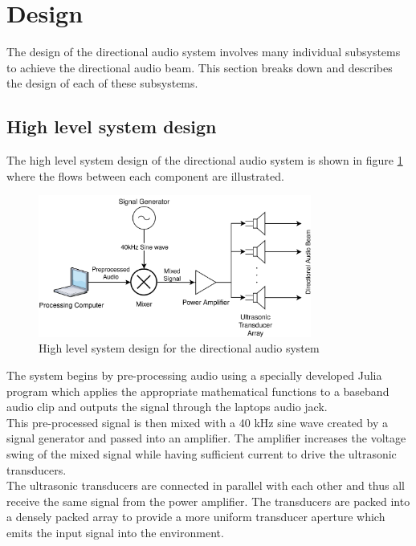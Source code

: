 \section{Design}
The design of the directional audio system involves many individual subsystems to achieve the directional audio beam. This section breaks down and describes the design of each of these subsystems.
\subsection{High level system design}
The high level system design of the directional audio system is shown in figure \ref{fig:highleveldesign} where the flows between each component are illustrated. 
\begin{figure}[h]
    \centering
    \includegraphics[width=0.8\textwidth]{Figures/Design/HighlevelSystemDesign.png}
    \caption{High level system design for the directional audio system}
    \label{fig:highleveldesign}
\end{figure}
The system begins by pre-processing audio using a specially developed Julia program which applies the appropriate mathematical functions to a baseband audio clip and outputs the signal through the laptops audio jack.\\
This pre-processed signal is then mixed with a 40 kHz sine wave created by a signal generator and passed into an amplifier. The amplifier increases the voltage swing of the mixed signal while having sufficient current to drive the ultrasonic transducers.\\
The ultrasonic transducers are connected in parallel with each other and thus all receive the same signal from the power amplifier. The transducers are packed into a densely packed array to provide a more uniform transducer aperture which emits the input signal into the environment.
